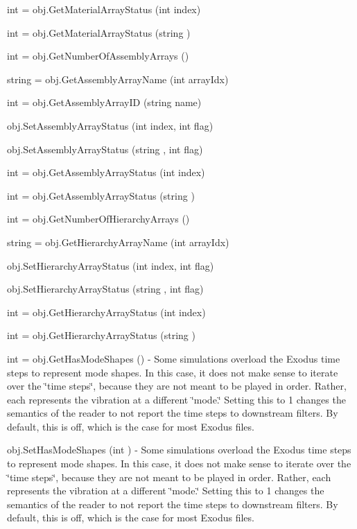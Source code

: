 \begin{DoxyItemize}
\item {\ttfamily int = obj.\-Get\-Material\-Array\-Status (int index)}  
\item {\ttfamily int = obj.\-Get\-Material\-Array\-Status (string )}  
\item {\ttfamily int = obj.\-Get\-Number\-Of\-Assembly\-Arrays ()}  
\item {\ttfamily string = obj.\-Get\-Assembly\-Array\-Name (int array\-Idx)}  
\item {\ttfamily int = obj.\-Get\-Assembly\-Array\-I\-D (string name)}  
\item {\ttfamily obj.\-Set\-Assembly\-Array\-Status (int index, int flag)}  
\item {\ttfamily obj.\-Set\-Assembly\-Array\-Status (string , int flag)}  
\item {\ttfamily int = obj.\-Get\-Assembly\-Array\-Status (int index)}  
\item {\ttfamily int = obj.\-Get\-Assembly\-Array\-Status (string )}  
\item {\ttfamily int = obj.\-Get\-Number\-Of\-Hierarchy\-Arrays ()}  
\item {\ttfamily string = obj.\-Get\-Hierarchy\-Array\-Name (int array\-Idx)}  
\item {\ttfamily obj.\-Set\-Hierarchy\-Array\-Status (int index, int flag)}  
\item {\ttfamily obj.\-Set\-Hierarchy\-Array\-Status (string , int flag)}  
\item {\ttfamily int = obj.\-Get\-Hierarchy\-Array\-Status (int index)}  
\item {\ttfamily int = obj.\-Get\-Hierarchy\-Array\-Status (string )}  
\item {\ttfamily int = obj.\-Get\-Has\-Mode\-Shapes ()} -\/ Some simulations overload the Exodus time steps to represent mode shapes. In this case, it does not make sense to iterate over the \char`\"{}time steps\char`\"{}, because they are not meant to be played in order. Rather, each represents the vibration at a different \char`\"{}mode.\char`\"{} Setting this to 1 changes the semantics of the reader to not report the time steps to downstream filters. By default, this is off, which is the case for most Exodus files.  
\item {\ttfamily obj.\-Set\-Has\-Mode\-Shapes (int )} -\/ Some simulations overload the Exodus time steps to represent mode shapes. In this case, it does not make sense to iterate over the \char`\"{}time steps\char`\"{}, because they are not meant to be played in order. Rather, each represents the vibration at a different \char`\"{}mode.\char`\"{} Setting this to 1 changes the semantics of the reader to not report the time steps to downstream filters. By default, this is off, which is the case for most Exodus files.  

\end{DoxyItemize}
